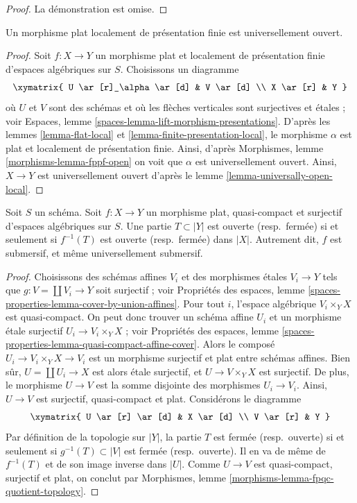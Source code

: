 \begin{proof}
La démonstration est omise.
\end{proof}

\begin{lemma}
\label{lemma-fppf-open}
Un morphisme plat localement de présentation finie est universellement ouvert.
\end{lemma}

\begin{proof}
Soit $f : X \to Y$ un morphisme plat et localement de présentation finie
d'espaces algébriques sur $S$. Choisissons un diagramme
$$
\xymatrix{
U \ar[r]_\alpha \ar[d] & V \ar[d] \\
X \ar[r] & Y
}
$$
où $U$ et $V$ sont des schémas et où les flèches verticales sont surjectives et
étales ; voir
Espaces, lemme \ref{spaces-lemma-lift-morphism-presentations}.
D'après les
lemmes \ref{lemma-flat-local} et \ref{lemma-finite-presentation-local},
le morphisme $\alpha$ est plat et localement de présentation finie.
Ainsi, d'après
Morphismes, lemme \ref{morphisms-lemma-fppf-open}
on voit que $\alpha$ est universellement ouvert.
Ainsi, $X \to Y$ est universellement ouvert d'après le
lemme \ref{lemma-universally-open-local}.
\end{proof}

\begin{lemma}
\label{lemma-fpqc-quotient-topology}
Soit $S$ un schéma.
Soit $f : X \to Y$ un morphisme plat, quasi-compact et surjectif
d'espaces algébriques sur $S$.
Une partie $T \subset |Y|$ est ouverte (resp.\ fermée) si et seulement si
$f^{-1}(T)$ est ouverte (resp.\ fermée) dans $|X|$.
Autrement dit, $f$ est submersif, et même universellement submersif.
\end{lemma}

\begin{proof}
Choisissons des schémas affines $V_i$ et des morphismes étales $V_i \to Y$ tels que
$g : V = \coprod V_i \to Y$ soit surjectif ; voir
Propriétés des espaces,
lemme \ref{spaces-properties-lemma-cover-by-union-affines}.
Pour tout $i$, l'espace algébrique $V_i \times_Y X$ est quasi-compact.
On peut donc trouver un schéma affine $U_i$ et un morphisme étale surjectif
$U_i \to V_i \times_Y X$ ; voir
Propriétés des espaces,
lemme \ref{spaces-properties-lemma-quasi-compact-affine-cover}.
Alors le composé $U_i \to V_i \times_Y X \to V_i$ est un morphisme surjectif
et plat entre schémas affines.
Bien sûr, $U = \coprod U_i \to X$ est alors étale surjectif,
et $U \to V \times_Y X$ est surjectif. De plus, le morphisme $U \to V$ est la
somme disjointe des morphismes $U_i \to V_i$. Ainsi, $U \to V$ est surjectif,
quasi-compact et plat. Considérons le diagramme
$$
\xymatrix{
U \ar[r] \ar[d] & X \ar[d] \\
V \ar[r] & Y
}
$$
Par définition de la topologie sur $|Y|$, la partie $T$ est fermée
(resp.\ ouverte) si et seulement si $g^{-1}(T) \subset |V|$ est fermée
(resp.\ ouverte). Il en va de même de
$f^{-1}(T)$ et de son image inverse dans $|U|$.
Comme $U \to V$ est quasi-compact, surjectif et plat, on conclut par
Morphismes, lemme \ref{morphisms-lemma-fpqc-quotient-topology}.
\end{proof}

